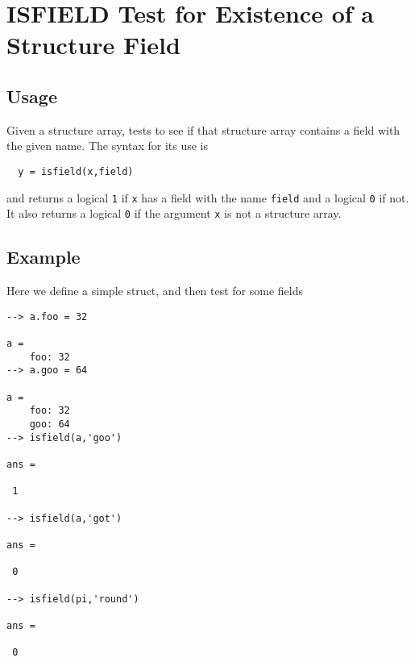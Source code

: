 \section{ISFIELD Test for Existence of a Structure Field}

\subsection{Usage}

Given a structure array, tests to see if that structure
array contains a field with the given name.  The syntax
for its use is
\begin{verbatim}
  y = isfield(x,field)
\end{verbatim}
and returns a logical \verb|1| if \verb|x| has a field with the 
name \verb|field| and a logical \verb|0| if not.  It also returns
a logical \verb|0| if the argument \verb|x| is not a structure array.
\subsection{Example}

Here we define a simple struct, and then test for some 
fields
\begin{verbatim}
--> a.foo = 32

a = 
    foo: 32
--> a.goo = 64

a = 
    foo: 32
    goo: 64
--> isfield(a,'goo')

ans = 

 1 

--> isfield(a,'got')

ans = 

 0 

--> isfield(pi,'round')

ans = 

 0 
\end{verbatim}
